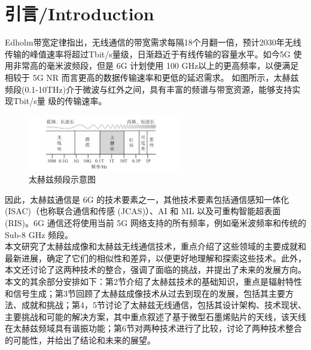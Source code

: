 
\section{引言/Introduction}

Edholm带宽定律指出，无线通信的带宽需求每隔18个月翻一倍，预计2030年无线传输的峰值速率将超过Tbit/s量级，日渐趋近于有线传输的容量水平。如今5G 使用非常高的毫米波频段，但是 6G 计划使用 100 GHz以上的更高频率，以便满足相较于 5G NR 而言更高的数据传输速率和更低的延迟需求。
如图所示，太赫兹频段(0.1-10THz)介于微波与红外之间，具有丰富的频谱与带宽资源，能够支持实现Tbit/s量
级的传输速率。

\begin{figure}[htbp]
	\centering
	\includegraphics[width=0.6\textwidth]{img/img1.png} %
	\caption{太赫兹频段示意图 \cite{chen2019artificial}}
	\label{fig:example}
\end{figure}

因此，太赫兹通信是 6G 的技术要素之一，其他技术要素包括通信感知一体化 (ISAC)（也称联合通信和传感 (JCAS)）、AI 和 ML 以及可重构智能超表面 (RIS)。6G 通信还将使用当前 5G 网络支持的所有频率，例如毫米波频率和传统的 Sub-8 GHz 频段。\\

本文研究了太赫兹成像和太赫兹无线通信技术，重点介绍了这些领域的主要成就和最新进展，确定了它们的相似性和差异，以便更好地理解和探索这些技术。此外，本文还讨论了这两种技术的整合，强调了面临的挑战，并提出了未来的发展方向。本文的其余部分安排如下：第2节介绍了太赫兹技术的基础知识，重点是辐射特性和信号生成；第3节回顾了太赫兹成像技术从过去到现在的发展，包括其主要方法、成就和挑战；第4，5节讨论了太赫兹无线通信，包括其设计架构、技术现状、主要挑战和可能的解决方案，其中重点叙述了基于微型石墨烯贴片的天线，该天线在太赫兹频域具有谐振功能；第6节对两种技术进行了比较，讨论了两种技术整合的可能性，并给出了结论和未来的展望。







